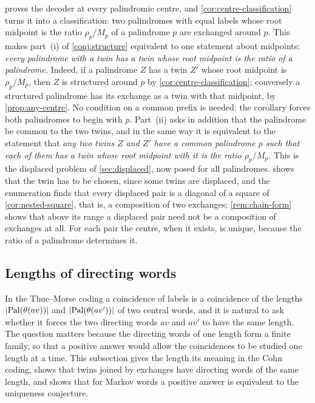  proves the decoder at every palindromic centre, and
\cref{cor:centre-classification} turns it into a classification: two palindromes with equal
labels whose root midpoint is the ratio $\rho_p/M_p$ of a palindrome $p$ are exchanged around $p$.
This makes part~(i) of \cref{conj:structure} equivalent to one statement about midpoints:
\emph{every palindrome with a twin has a twin whose root midpoint is the ratio of a palindrome.}
Indeed, if a palindrome $Z$ has a twin $Z'$ whose root midpoint is $\rho_p/M_p$, then $Z$ is
structured around $p$ by \cref{cor:centre-classification}; conversely a structured palindrome
has its exchange as a twin with that midpoint, by \cref{prop:any-centre}. No condition on a
common prefix is needed: the corollary forces both palindromes to begin with $p$. Part~(ii)
asks in addition that the palindrome be common to the two twins, and in the same way it is
equivalent to the statement that \emph{any two twins $Z$ and $Z'$ have a common palindrome $p$
such that each of them has a twin whose root midpoint with it is the ratio $\rho_p/M_p$.} This is
the displaced problem of \cref{sec:displaced}, now posed for all palindromes. 
shows that the twin has to be chosen, since some twins are displaced, and the enumeration finds
that every displaced pair is a diagonal of a square of \cref{cor:nested-square}, that is, a
composition of two exchanges; \cref{rem:chain-form} shows that above its range a displaced pair
need not be a composition of exchanges at all. For each pair the centre, when it exists, is unique, because the
ratio of a palindrome determines it.

\subsection{Lengths of directing words}
\label{subsec:lengths}

In the Thue--Morse coding a coincidence of labels is a coincidence of the lengths
$\lvert\operatorname{Pal}(\theta(av))\rvert$ and $\lvert\operatorname{Pal}(\theta(av'))\rvert$ of two central
words, and it is natural to ask whether it forces the two directing words $av$ and $av'$ to have
the same length. The question matters because the directing words of one length form a finite
family, so that a positive answer would allow the coincidences to be studied one length at a
time. This subsection gives the length its meaning in the Cohn coding, shows that twins joined by
exchanges have directing words of the same length, and shows that for Markov words a positive
answer is equivalent to the uniqueness conjecture.

